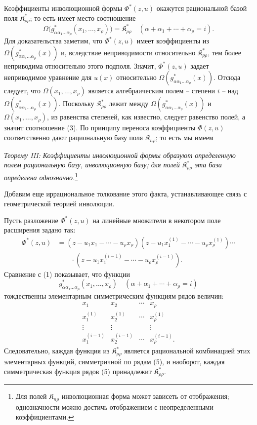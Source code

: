 \documentclass[11pt]{article}
\providecommand{\Kfield}{\mathfrak{K}}
\begin{document}
Коэффициенты инволюционной формы $\Phi^*(z,u)$ окажутся рациональной базой поля $\Kfield^*_{\rho\rho}$; то есть имеет место соотношение
\begin{equation}
  \Omega\bigl(g^*_{\alpha\alpha_1\ldots\alpha_\rho}(x_1,
  \ldots,x_\rho)\bigr)=\Kfield^*_{\rho\rho}
  \quad(\alpha+\alpha_1+\cdots+\alpha_\rho=i).
\tag{3}
\end{equation}
Для доказательства заметим, что $\Phi^*(z,u)$ имеет коэффициенты из $\Omega(g^*_{\alpha\alpha_1\ldots\alpha_\rho}(x))$ и, вследствие неприводимости относительно $\Kfield^*_{\rho\rho}$, тем более неприводима относительно этого подполя. Значит, $\Phi^*(z,u)$ задает неприводимое уравнение для $u(x)$ относительно $\Omega(g^*_{\alpha\alpha_1\ldots\alpha_\rho}(x))$. Отсюда следует, что $\Omega(x_1,\ldots,x_\rho)$ является алгебраическим полем -- степени $i$ -- над $\Omega(g^*_{\alpha\alpha_1\ldots\alpha_\rho}(x))$. Поскольку $\Kfield^*_{\rho\rho}$ лежит между $\Omega(g^*_{\alpha\alpha_1\ldots\alpha_\rho}(x))$ и $\Omega(x_1,\ldots,x_\rho)$, из равенства степеней, как известно, следует равенство полей, а значит соотношение (3). По принципу переноса коэффициенты $\Phi(z,u)$ соответственно дают рациональную базу поля $\Kfield_{n\rho}$; то есть мы имеем

\emph{Теорему III: Коэффициенты инволюционной формы образуют определенную полем рациональную базу, инволюционную базу; для полей $\Kfield^*_{\rho\rho}$ эта база определена однозначно.}\footnote{Для полей $\Kfield_{n\rho}$ инволюционная форма может зависеть от отображения; однозначности можно достичь отображением с неопределенными коэффициентами.}

Добавим еще иррациональное толкование этого факта, устанавливающее связь с геометрической теорией инволюции.

Пусть разложение $\Phi^*(z,u)$ на линейные множители в некотором поле расширения задано так:
\begin{equation}
\begin{aligned}
 \Phi^*(z,u)&=(z-u_1x_1-\cdots-u_\rho x_\rho)
 (z-u_1x_1^{(1)}-\cdots-u_\rho x_\rho^{(1)})\cdots\\
 &\qquad\cdot
 (z-u_1x_1^{(i-1)}-\cdots-u_\rho x_\rho^{(i-1)}).
\end{aligned}
\tag{4}
\end{equation}
Сравнение с (1) показывает, что функции
\[
  g^*_{\alpha\alpha_1\ldots\alpha_\rho}(x_1,
  \ldots,x_\rho)\quad(\alpha+\alpha_1+\cdots+\alpha_\rho=i)
\]
тождественны элементарным симметрическим функциям рядов величин:
\begin{equation}
\begin{array}{cccc}
  x_1 & x_2 & \cdots & x_\rho\\
  x_1^{(1)} & x_2^{(1)} & \cdots & x_\rho^{(1)}\\
  \vdots & \vdots & & \vdots\\
  x_1^{(i-1)} & x_2^{(i-1)} & \cdots & x_\rho^{(i-1)}.
\end{array}
\tag{5}
\end{equation}
Следовательно, каждая функция из $\Kfield^*_{\rho\rho}$ является рациональной комбинацией этих элементарных функций, симметричной по рядам (5), и наоборот, каждая симметрическая функция рядов (5) принадлежит $\Kfield^*_{\rho\rho}$.
\end{document}
